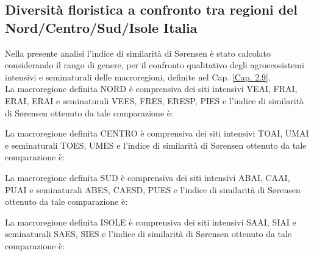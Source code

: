 \documentclass[main.tex]{subfiles}
\begin{document}
\subsection{Diversità floristica a confronto tra regioni del Nord/Centro/Sud/Isole Italia}

Nella presente analisi l’indice di similarità di Sørensen è stato calcolato considerando il rango di genere, per il confronto qualitativo degli agroecosistemi intensivi e seminaturali delle macroregioni, definite nel Cap. \ref{Cap. 2.9}. \\
La macroregione definita NORD è comprensiva dei siti intensivi VEAI, FRAI, ERAI, ERAI e seminaturali VEES, FRES, ERESP, PIES e l’indice di similarità di Sørensen ottenuto da tale comparazione è:

\medskip

\raggedright
La macroregione definita CENTRO è comprensiva dei siti intensivi TOAI, UMAI e seminaturali TOES, UMES e l’indice di similarità di Sørensen ottenuto da tale comparazione è:

\medskip

\raggedright
La macroregione definita SUD è comprensiva dei siti intensivi ABAI, CAAI, PUAI e seminaturali ABES, CAESD, PUES e l’indice di similarità di Sørensen ottenuto da tale comparazione è:

\medskip

\raggedright
La macroregione definita ISOLE è comprensiva dei siti intensivi SAAI, SIAI e seminaturali SAES, SIES e l’indice di similarità di Sørensen ottenuto da tale comparazione è:

\end{document}
